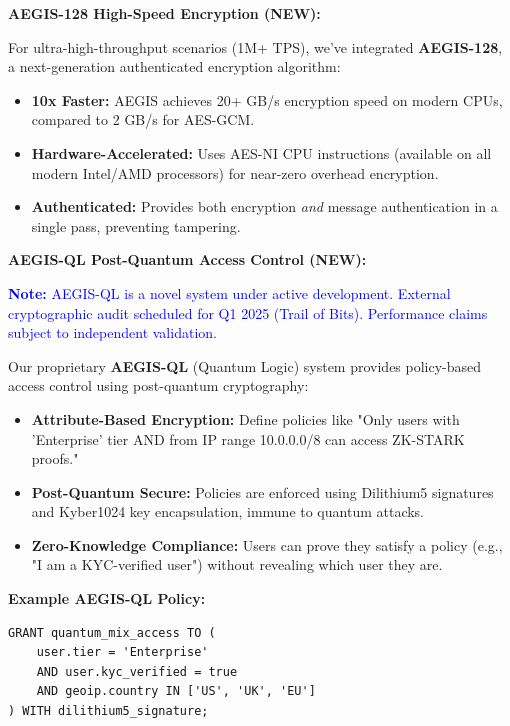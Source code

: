 \documentclass[11pt,a4paper]{article}
\begin{document}
\textbf{AEGIS-128 High-Speed Encryption (NEW):}

For ultra-high-throughput scenarios (1M+ TPS), we've integrated \textbf{AEGIS-128}, a next-generation authenticated encryption algorithm:
\begin{itemize}
    \item \textbf{10x Faster:} AEGIS achieves 20+ GB/s encryption speed on modern CPUs, compared to 2 GB/s for AES-GCM.

    \item \textbf{Hardware-Accelerated:} Uses AES-NI CPU instructions (available on all modern Intel/AMD processors) for near-zero overhead encryption.

    \item \textbf{Authenticated:} Provides both encryption \textit{and} message authentication in a single pass, preventing tampering.
\end{itemize}

\textbf{AEGIS-QL Post-Quantum Access Control (NEW):}

\textcolor{blue}{\textbf{Note:} AEGIS-QL is a novel system under active development. External cryptographic audit scheduled for Q1 2025 (Trail of Bits). Performance claims subject to independent validation.}

Our proprietary \textbf{AEGIS-QL} (Quantum Logic) system provides policy-based access control using post-quantum cryptography:
\begin{itemize}
    \item \textbf{Attribute-Based Encryption:} Define policies like "Only users with 'Enterprise' tier AND from IP range 10.0.0.0/8 can access ZK-STARK proofs."

    \item \textbf{Post-Quantum Secure:} Policies are enforced using Dilithium5 signatures and Kyber1024 key encapsulation, immune to quantum attacks.

    \item \textbf{Zero-Knowledge Compliance:} Users can prove they satisfy a policy (e.g., "I am a KYC-verified user") without revealing which user they are.
\end{itemize}

\textbf{Example AEGIS-QL Policy:}
\begin{verbatim}
GRANT quantum_mix_access TO (
    user.tier = 'Enterprise'
    AND user.kyc_verified = true
    AND geoip.country IN ['US', 'UK', 'EU']
) WITH dilithium5_signature;
\end{verbatim}
\end{document}
